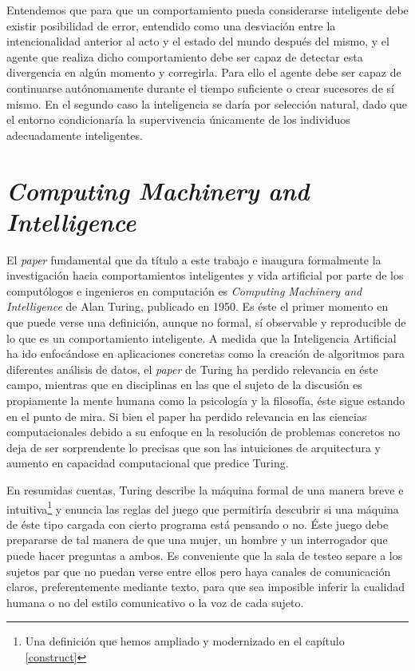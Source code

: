 \documentclass[12pt]{memoir}
\begin{document}
Entendemos que para que un comportamiento pueda considerarse inteligente debe existir posibilidad de error, entendido como una desviación entre la intencionalidad anterior al acto y  el estado del mundo después del mismo, y el agente que realiza dicho comportamiento debe ser capaz de detectar esta divergencia en algún momento y corregirla. Para ello el agente debe ser capaz de continuarse autónomamente durante el tiempo suficiente o crear sucesores de sí mismo. En el segundo caso la inteligencia se daría por selección natural, dado que el entorno condicionaría la supervivencia únicamente de los individuos adecuadamente inteligentes.


\section{\textit{Computing Machinery and Intelligence}}

El \textit{paper} fundamental que da título a este trabajo e inaugura formalmente la investigación hacia comportamientos inteligentes y vida artificial por parte de los computólogos e ingenieros en computación es \textit{Computing Machinery and Intelligence} de Alan Turing, publicado en 1950. Es éste el primer momento en que puede verse una definición, aunque no formal, sí observable y reproducible de lo que es un comportamiento inteligente. A medida que la Inteligencia Artificial ha ido enfocándose en aplicaciones concretas como la creación de algoritmos para diferentes análisis de datos, el \textit{paper} de Turing ha perdido relevancia en éste campo, mientras que en disciplinas en las que el sujeto de la discusión es propiamente la mente humana como la psicología y la filosofía, éste sigue estando en el punto de mira. Si bien el paper ha perdido relevancia en las ciencias computacionales debido a su enfoque en la resolución de problemas concretos no deja de ser sorprendente lo precisas que son las intuiciones de arquitectura y aumento en capacidad computacional que predice Turing.

En resumidas cuentas, Turing describe la máquina formal de una manera breve e intuitiva\footnote{Una definición que hemos ampliado y modernizado en el capítulo 
\ref{construct}} y enuncia las reglas del juego que permitiría descubrir si una máquina de éste tipo cargada con cierto programa está pensando o no. Éste juego debe prepararse de tal manera de que una mujer, un hombre y un interrogador que puede hacer preguntas a ambos. Es conveniente que la sala de testeo separe a los sujetos par que no puedan verse entre ellos pero haya canales de comunicación claros, preferentemente mediante texto, para que sea imposible inferir la cualidad humana o no del estilo comunicativo o la voz de cada sujeto. 
\end{document}
